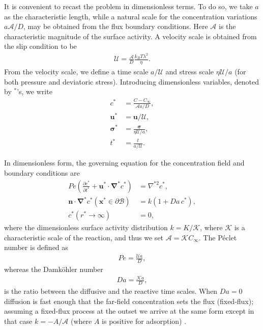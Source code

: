 \documentclass[aps,pre,reprint,twocolumn,notitlepage,superscriptaddress]{revtex4-1}
\begin{document}
It is convenient to recast the problem in dimensionless terms. To do so, we take $a$ as the characteristic length, while a natural scale for the concentration variations $a\mathcal{A}/D$, may be obtained from the flux boundary conditions. Here $\mathcal{A}$ is the characteristic magnitude of the surface activity. A velocity scale is obtained from the slip condition to be
\begin{align}
\mathcal{U} = \frac{\mathcal{A}}{D}\frac{k_{B}T\lambda^{2}}{\eta}.
\end{align}
From the velocity scale, we define a time scale $a/\mathcal{U}$ and stress scale $\eta \mathcal{U}/a$ (for both pressure and deviatoric stress). Introducing dimensionless variables, denoted by $^*$'s, we write
\begin{align}
c^{*}&=\frac{C-C_{\infty}}{\mathcal{A}a/D},\\
\boldsymbol{u}^* &= \boldsymbol{u}/\mathcal{U},\\
\boldsymbol{\sigma}^* &= \frac{\boldsymbol{\sigma}}{\eta \mathcal{U}/a},\\
t^* &= \frac{t}{a /\mathcal{U}}.
\end{align}

In dimensionless form, the governing equation for the concentration field and boundary conditions are
\begin{align}
Pe\left(\frac{\partial c^*}{\partial t^*} + \boldsymbol{u}^* \cdot \boldsymbol{\nabla}^* c^*\right) &= \nabla^{*2} c^*,\label{conc}\\
\boldsymbol{n}\cdot\boldsymbol{\nabla}^* c^* (\boldsymbol{x^*} \in \partial \mathcal{B})&=k\left(1+Da\, c^{*}\right),\label{cocbad}\\
c^{*}(r^{*}\longrightarrow \infty)&= 0,\label{conbcad}
\end{align}
where the dimensionless surface activity distribution $k=K/\mathcal{K}$, where $\mathcal{K}$ is a characteristic scale of the reaction, and thus we set $\mathcal{A}=\mathcal{K}C_\infty$. The P\'eclet number is defined as 
\begin{align}\label{Pe}
Pe=\frac{\mathcal{U}a}{D},
\end{align}
whereas the Damk\"ohler number
\begin{align}\label{Da}
Da = \frac{\mathcal{K}a}{D},
\end{align}
is the ratio between the diffusive and the reactive time scales. When $Da=0$ diffusion is fast enough that the far-field concentration sets the flux (fixed-flux); assuming a fixed-flux process at the outset we arrive at the same form except in that case $k=-A/\mathcal{A}$ (where $A$ is positive for adsorption) \citep{michelin14}.
\end{document}
